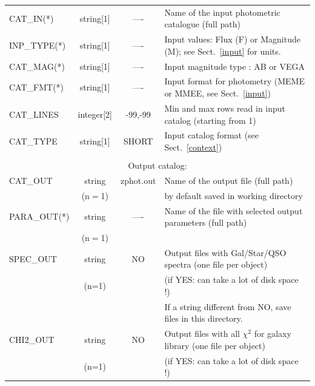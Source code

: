 \documentclass[12pt]{article}
\begin{document}
\begin{table}
\begin{tabular}{lccl}
CAT\_IN(*)          & string[1]  &  ----   & Name of the input photometric catalogue (full path)    \\[3pt]
%
INP\_TYPE(*)        & string[1]  &  ----   &  Input  values:  Flux (F) or Magnitude (M); see Sect.~\ref{input} for units.               \\[3pt]
%  
CAT\_MAG(*)         & string[1]  &  ----   &  Input magnitude type : AB or VEGA                       \\[3pt]
%
CAT\_FMT(*)      & string[1]  &  ----   &  Input format for photometry (MEME or MMEE, see Sect.~\ref{input}) \\[3pt]                     
%
CAT\_LINES       & integer[2] & -99,-99&  Min and max rows read in input catalog (starting from 1)   \\[3pt]     
%
CAT\_TYPE      &  string[1]   & SHORT & Input catalog format (see Sect.~\ref{context})\\[3pt]
\hline
%

\hline \\[3pt]
                    \multicolumn{4}{c}{Output catalog:} \\
\hline
CAT\_OUT      & string    &zphot.out& Name of the output file (full path)                       \\
                        & (n$=$1)&               &  by default saved in working directory                   \\
%
PARA\_OUT(*) & string  &  ----   &  Name of the file with selected output parameters  (full path)      \\
                         & (n$=$1) &         &                                                          \\        

%
SPEC\_OUT     &  string &  NO     &  Output files with Gal/Star/QSO spectra (one file per object)     \\
                         &  (n=1)  &            &  (if YES: can take a lot of disk space !)                         \\
                         &         &   & If a string different from NO, save files in this directory.\\
%
CHI2\_OUT       &  string &  NO     &  Output files with all $\chi^2$ for galaxy library (one file per object)   \\
                          &  (n=1)  &            &  (if YES: can take a lot of disk space !)                         \\
\hline
\hline
\end{tabular}
\end{table}
\end{document}
